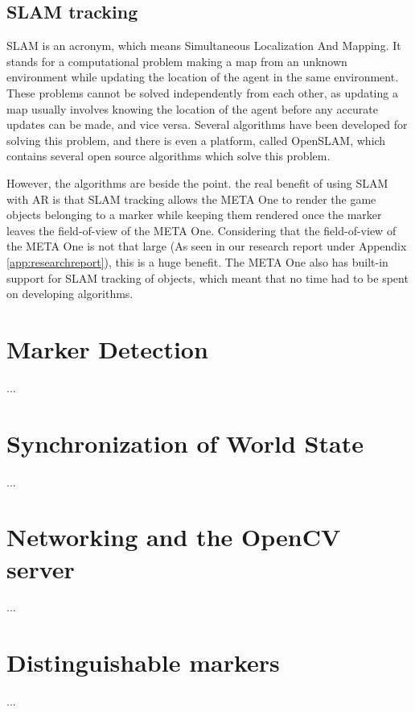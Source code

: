 		\subsection{SLAM tracking} \label{ssec:slamloc}
			SLAM is an acronym, which means Simultaneous Localization And
			Mapping. It stands for a computational problem making a map
			from an unknown environment while updating the location of the
			agent in the same environment. These problems cannot be solved
			independently from each other, as updating a map usually involves
			knowing the location of the agent before any accurate updates
			can be made, and vice versa. Several algorithms have been developed
			for solving this problem, and there is even a platform, called OpenSLAM,
			which contains several open source algorithms which solve this
			problem.
			
			However, the algorithms are beside the point. the real benefit of 
			using SLAM with AR is that SLAM tracking allows the META One to
			render the game objects belonging to a marker while keeping them
			rendered once the marker leaves the field-of-view of the META One.
			Considering that the field-of-view of the META One is not that large
			(As seen in our research report under Appendix \ref{app:researchreport}),
			this is a huge benefit. The META One also has built-in support for
			SLAM tracking of objects, which meant that no time had to be spent
			on developing algorithms.

	\section{Marker Detection} \label{sec:markerdetection}
		...
		
	\section{Synchronization of World State} \label{sec:synchronization}
		...
		
	\section{Networking and the OpenCV server} \label{sec:network}
		...
	\section{Distinguishable markers} \label{sec:markers}
		...